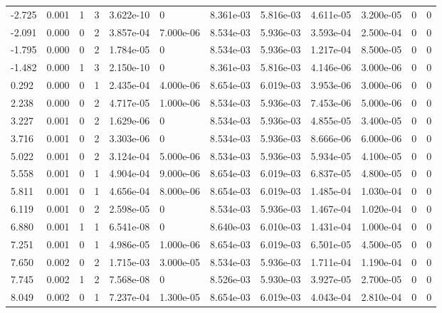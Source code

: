 \documentclass[preview]{standalone}
\begin{document}
{{\begin{tabular}{L{1.2cm}C{1.2cm} C{0.3cm}C{0.5cm} C{1.4cm}C{1.4cm} C{1.4cm}C{1.4cm} C{1.6cm}C{1.6cm} C{1.6cm}C{1.6cm}}
  -2.725  &  0.001  & 1     &  3 &  3.622e-10  & 0  &  8.361e-03&   5.816e-03& 4.611e-05 & 3.200e-05   &  0 & 0  \\ 
  -2.091  &  0.000  & 0     &  2 &  3.857e-04  & 7.000e-06  &  8.534e-03&   5.936e-03& 3.593e-04 & 2.500e-04   &  0 & 0  \\ 
  -1.795  &  0.000  & 0     &  2 &  1.784e-05  & 0  &  8.534e-03&   5.936e-03& 1.217e-04 & 8.500e-05   &  0 & 0  \\ 
  -1.482  &  0.000  & 1     &  3 &  2.150e-10  & 0  &  8.361e-03&   5.816e-03& 4.146e-06 & 3.000e-06   &  0 & 0  \\ 
  0.292  &  0.000  & 0     &  1 &  2.435e-04  & 4.000e-06  &  8.654e-03&   6.019e-03& 3.953e-06 & 3.000e-06   &  0 & 0  \\ 
  2.238  &  0.000  & 0     &  2 &  4.717e-05  & 1.000e-06  &  8.534e-03&   5.936e-03& 7.453e-06 & 5.000e-06   &  0 & 0  \\ 
  3.227  &  0.001  & 0     &  2 &  1.629e-06  & 0  &  8.534e-03&   5.936e-03& 4.855e-05 & 3.400e-05   &  0 & 0  \\ 
  3.716  &  0.001  & 0     &  2 &  3.303e-06  & 0  &  8.534e-03&   5.936e-03& 8.666e-06 & 6.000e-06   &  0 & 0  \\ 
  5.022  &  0.001  & 0     &  2 &  3.124e-04  & 5.000e-06  &  8.534e-03&   5.936e-03& 5.934e-05 & 4.100e-05   &  0 & 0  \\ 
  5.558  &  0.001  & 0     &  1 &  4.904e-04  & 9.000e-06  &  8.654e-03&   6.019e-03& 6.837e-05 & 4.800e-05   &  0 & 0  \\ 
  5.811  &  0.001  & 0     &  1 &  4.656e-04  & 8.000e-06  &  8.654e-03&   6.019e-03& 1.485e-04 & 1.030e-04   &  0 & 0  \\ 
  6.119  &  0.001  & 0     &  2 &  2.598e-05  & 0  &  8.534e-03&   5.936e-03& 1.467e-04 & 1.020e-04   &  0 & 0  \\ 
  6.880  &  0.001  & 1     &  1 &  6.541e-08  & 0  &  8.640e-03&   6.010e-03& 1.431e-04 & 1.000e-04   &  0 & 0  \\ 
  7.251  &  0.001  & 0     &  1 &  4.986e-05  & 1.000e-06  &  8.654e-03&   6.019e-03& 6.501e-05 & 4.500e-05   &  0 & 0  \\ 
  7.650  &  0.002  & 0     &  2 &  1.715e-03  & 3.000e-05  &  8.534e-03&   5.936e-03& 1.711e-04 & 1.190e-04   &  0 & 0  \\ 
  7.745  &  0.002  & 1     &  2 &  7.568e-08  & 0  &  8.526e-03&   5.930e-03& 3.927e-05 & 2.700e-05   &  0 & 0  \\ 
  8.049  &  0.002  & 0     &  1 &  7.237e-04  & 1.300e-05  &  8.654e-03&   6.019e-03& 4.043e-04 & 2.810e-04   &  0 & 0  \\ 

\end{tabular}}}
\end{document}
